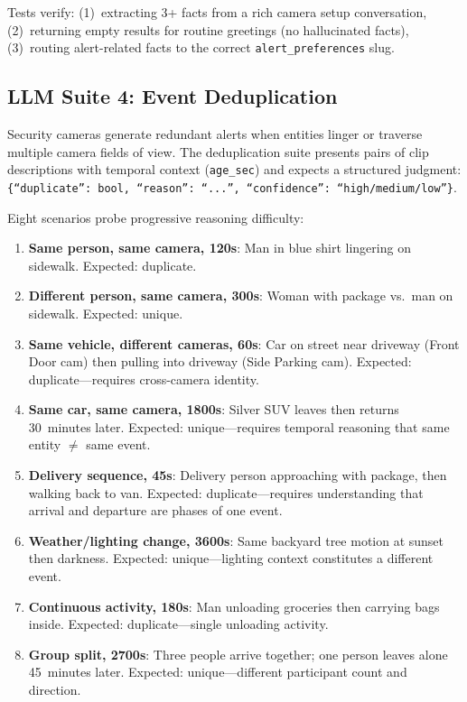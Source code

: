 \documentclass[onecolumn,10pt]{IEEEtran}
\begin{document}
Tests verify: (1)~extracting 3+ facts from a rich camera setup
conversation, (2)~returning empty results for routine greetings
(no hallucinated facts), (3)~routing alert-related facts to the
correct \texttt{alert\_preferences} slug.

\subsection{LLM Suite 4: Event Deduplication}

Security cameras generate redundant alerts when entities linger or
traverse multiple camera fields of view. The deduplication suite
presents pairs of clip descriptions with temporal context (\texttt{age\_sec})
and expects a structured judgment:
\texttt{\{``duplicate'': bool, ``reason'': ``...'', ``confidence'': ``high/medium/low''\}}.

Eight scenarios probe progressive reasoning difficulty:

\begin{enumerate}[nosep]
    \item \textbf{Same person, same camera, 120s}: Man in blue shirt
    lingering on sidewalk. Expected: duplicate.
    \item \textbf{Different person, same camera, 300s}: Woman with package
    vs.\ man on sidewalk. Expected: unique.
    \item \textbf{Same vehicle, different cameras, 60s}: Car on street
    near driveway (Front Door cam) then pulling into driveway (Side
    Parking cam). Expected: duplicate---requires cross-camera identity.
    \item \textbf{Same car, same camera, 1800s}: Silver SUV leaves then
    returns 30~minutes later. Expected: unique---requires temporal
    reasoning that same entity $\neq$ same event.
    \item \textbf{Delivery sequence, 45s}: Delivery person approaching
    with package, then walking back to van. Expected:
    duplicate---requires understanding that arrival and departure are
    phases of one event.
    \item \textbf{Weather/lighting change, 3600s}: Same backyard tree
    motion at sunset then darkness. Expected: unique---lighting context
    constitutes a different event.
    \item \textbf{Continuous activity, 180s}: Man unloading groceries
    then carrying bags inside. Expected: duplicate---single
    unloading activity.
    \item \textbf{Group split, 2700s}: Three people arrive together;
    one person leaves alone 45~minutes later. Expected: unique---different
    participant count and direction.
\end{enumerate}
\end{document}

